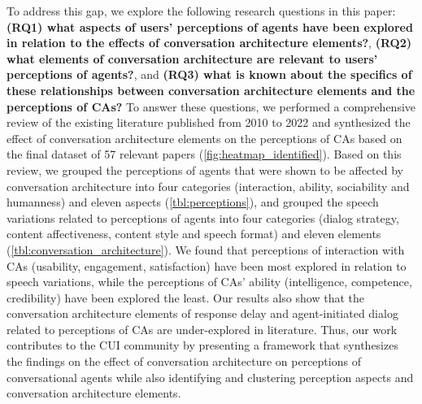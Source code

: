 To address this gap, %
we explore the following research questions in this paper: \textbf{(RQ1) what aspects of users' perceptions of agents have been explored in relation to the effects of conversation architecture elements?}, \textbf{(RQ2) what elements of conversation architecture are relevant to users' perceptions of agents?}, and \textbf{(RQ3) what is known about the specifics of these relationships between conversation architecture elements and the perceptions of CAs?}
To answer these questions, we performed a comprehensive review of the existing literature published from 2010 to 2022 and synthesized the effect of conversation architecture elements on the perceptions of CAs based on the final dataset of 57 relevant papers (\autoref{fig:heatmap_identified}). Based on this review, we grouped the perceptions of agents that were shown to be affected by conversation architecture into four categories (interaction, ability, sociability and humanness) and eleven aspects (\autoref{tbl:perceptions}), and grouped the speech variations related to perceptions of agents into four categories (dialog strategy, content affectiveness, content style and speech format) and eleven elements (\autoref{tbl:conversation_architecture}). 
We found that perceptions of interaction with CAs (usability, engagement, satisfaction) have been most explored in relation to speech variations, while the perceptions of CAs' ability (intelligence, competence, credibility) have been explored the least.
Our results also show that the conversation architecture elements of response delay and agent-initiated dialog related to perceptions of CAs are under-explored in literature. 
Thus, our work contributes to the CUI community by presenting a framework that synthesizes the findings on the effect of conversation architecture on perceptions of conversational agents while also identifying and clustering perception aspects and conversation architecture elements. %

